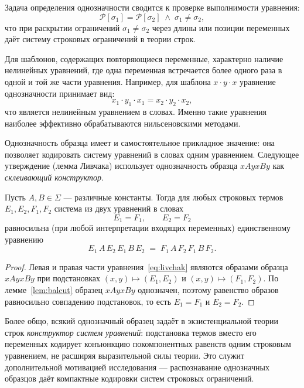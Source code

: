 \documentclass[14pt, russian]{scrartcl}
\begin{document}
Задача определения однозначности сводится к проверке выполнимости уравнения:
\begin{equation}
\mathcal{P}[\sigma_1] = \mathcal{P}[\sigma_2] \;\wedge\; \sigma_1 \neq \sigma_2,
\end{equation}
что при раскрытии ограничений $\sigma_1 \neq \sigma_2$ через длины или позиции переменных
даёт систему строковых ограничений в теории строк.

Для шаблонов, содержащих повторяющиеся переменные, характерно наличие нелинейных уравнений,
где одна переменная встречается более одного раза в одной и той же части уравнения. Например, для шаблона
$x \cdot y \cdot x$ уравнение однозначности принимает вид:
\begin{equation}
x_1 \cdot y_1 \cdot x_1 = x_2 \cdot y_2 \cdot x_2,
\end{equation}
что является нелинейным уравнением в словах. Именно такие уравнения наиболее
эффективно обрабатываются нильсеновскими методами.

Однозначность образца имеет и самостоятельное прикладное значение: она позволяет
кодировать систему уравнений в словах одним уравнением. Следующее утверждение
(лемма Ливчака) использует однозначность образца $x A y x B y$ как
\textit{склеивающий конструктор}.

\begin{Lemma}
\label{lem:livchak}
Пусть $A, B \in \Sigma$ --- различные константы. Тогда для любых строковых термов
$E_1, E_2, F_1, F_2$ система из двух уравнений в словах
\begin{equation}
E_1 = F_1, \qquad E_2 = F_2
\end{equation}
равносильна (при любой интерпретации входящих переменных) единственному уравнению
\begin{equation}
\label{eq:livchak}
E_1\, A\, E_2\, E_1\, B\, E_2 \;=\; F_1\, A\, F_2\, F_1\, B\, F_2 .
\end{equation}
\end{Lemma}

\begin{proof}
Левая и правая части уравнения~\eqref{eq:livchak} являются образами образца
$x A y x B y$ при подстановках $(x, y) \mapsto (E_1, E_2)$ и
$(x, y) \mapsto (F_1, F_2)$. По лемме~\ref{lem:balcut} образец $x A y x B y$
однозначен, поэтому равенство образов равносильно совпадению подстановок, то есть
$E_1 = F_1$ и $E_2 = F_2$.
\end{proof}

Более общо, всякий однозначный образец задаёт в экзистенциальной теории строк
\textit{конструктор систем уравнений}: подстановка термов вместо его переменных
кодирует конъюнкцию покомпонентных равенств одним строковым уравнением, не расширяя
выразительной силы теории. Это служит дополнительной мотивацией исследования ---
распознавание однозначных образцов даёт компактные кодировки систем строковых
ограничений.
\end{document}
